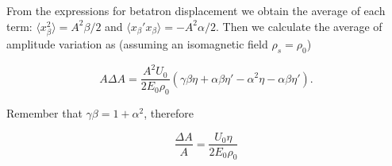 \documentclass[../sands-adaptation.tex]{subfiles}
\begin{document}
From the expressions for betatron displacement we obtain the average of each term: $\langle x_\beta ^2 \rangle = A^2 \beta /2$ and $\langle x_\beta' x_\beta  \rangle =  - A^2 \alpha /2$.
Then we calculate the average of amplitude variation as (assuming an isomagnetic field $\rho_s = \rho_0$)

\[
A\Delta A = \dfrac{ A^2 U_0}{2 E_0 \rho_0} \left(\gamma \beta \eta + \alpha \beta \eta' - \alpha^2\eta  - \alpha \beta  \eta'\right).
\]

Remember that $\gamma\beta = 1 + \alpha^2$, therefore

\begin{equation}
\dfrac{\Delta A}{A} = \dfrac{U_0 \eta }{2 E_0 \rho_0}
\end{equation}
\end{document}

